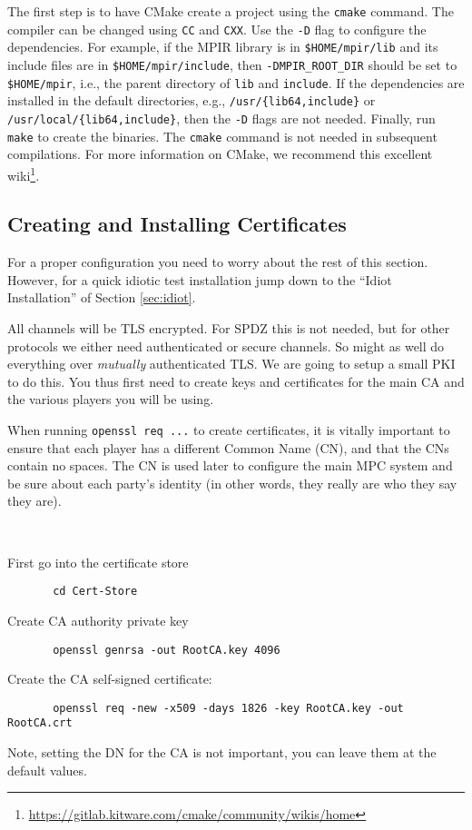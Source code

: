 The first step is to have CMake create a project using the \verb+cmake+ command.
The compiler can be changed using \verb+CC+ and \verb+CXX+.
Use the \verb+-D+ flag to configure the dependencies.
For example, if the MPIR library is in \verb+$HOME/mpir/lib+ and its include files are in \verb+$HOME/mpir/include+,
then \verb+-DMPIR_ROOT_DIR+ should be set to \verb+$HOME/mpir+, i.e., the parent directory of \verb+lib+ and \verb+include+.
If the dependencies are installed in the default directories,
e.g., \verb+/usr/{lib64,include}+ or \verb+/usr/local/{lib64,include}+,
then the \verb+-D+ flags are not needed.
Finally, run \verb+make+ to create the binaries.
The \verb+cmake+ command is not needed in subsequent compilations.
For more information on CMake, we recommend this excellent wiki\footnote{\url{https://gitlab.kitware.com/cmake/community/wikis/home}}.


\subsection{Creating and Installing Certificates}
For a proper configuration you need to worry about the rest
of this section.
However, for a quick idiotic test installation jump down to the ``Idiot
Installation'' of Section \ref{sec:idiot}.

All channels will be TLS encrypted. For SPDZ this is not needed, but for
other protocols we either need authenticated or secure channels. So might
as well do everything over {\em mutually} authenticated TLS. We are going
to setup a small PKI to do this. You thus first need to create
keys and certificates for the main CA and the various players you
will be using.

When running \verb+openssl req ...+ to create certificates, it is
vitally important to ensure that each player has a different Common
Name (CN), and that the CNs contain no spaces.  The CN is used later
to configure the main MPC system and be sure about each party's
identity (in other words, they really are who they say they are).

~~

\noindent
First go into the certificate store
\begin{verbatim}
       cd Cert-Store
\end{verbatim}
Create CA authority private key
\begin{verbatim}
       openssl genrsa -out RootCA.key 4096
\end{verbatim}
Create the CA self-signed certificate:
\begin{verbatim}
       openssl req -new -x509 -days 1826 -key RootCA.key -out RootCA.crt
\end{verbatim}
Note, setting the DN for the CA is not important, you can leave them
at the default values.

